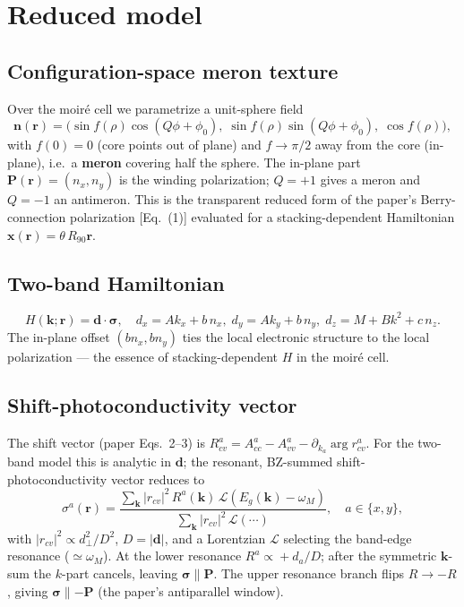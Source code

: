\documentclass[11pt]{article}
\begin{document}
\section{Reduced model}
\subsection{Configuration-space meron texture}
Over the moir\'e cell we parametrize a unit-sphere field
\begin{equation}
\mathbf n(\mathbf r)=\big(\sin f(\rho)\cos(Q\phi+\phi_0),\;\sin f(\rho)\sin(Q\phi+\phi_0),\;\cos f(\rho)\big),
\end{equation}
with $f(0)=0$ (core points out of plane) and $f\!\to\!\pi/2$ away from the core (in-plane),
i.e.\ a \textbf{meron} covering half the sphere. The in-plane part $\mathbf P(\mathbf r)=(n_x,n_y)$
is the winding polarization; $Q=+1$ gives a meron and $Q=-1$ an antimeron. This is the
transparent reduced form of the paper's Berry-connection polarization
[Eq.~(1)] evaluated for a stacking-dependent Hamiltonian $\mathbf x(\mathbf r)=\theta\,R_{90}\mathbf r$.

\subsection{Two-band Hamiltonian}
\begin{equation}
H(\mathbf k;\mathbf r)=\mathbf d\cdot\boldsymbol\sigma,\quad
d_x=Ak_x+b\,n_x,\; d_y=Ak_y+b\,n_y,\; d_z=M+B k^2+c\,n_z .
\end{equation}
The in-plane offset $(b n_x, b n_y)$ ties the local electronic structure to the local
polarization --- the essence of stacking-dependent $H$ in the moir\'e cell.

\subsection{Shift-photoconductivity vector}
The shift vector (paper Eqs.~2--3) is
$R^a_{cv}=A^a_{cc}-A^a_{vv}-\partial_{k_a}\arg r^a_{cv}$.
For the two-band model this is analytic in $\mathbf d$; the resonant, BZ-summed
shift-photoconductivity vector reduces to
\begin{equation}
\sigma^a(\mathbf r)=\frac{\sum_{\mathbf k} |r_{cv}|^2\, R^a(\mathbf k)\, \mathcal L(E_g(\mathbf k)-\omega_M)}
{\sum_{\mathbf k}|r_{cv}|^2\,\mathcal L(\cdots)},\quad a\in\{x,y\},
\end{equation}
with $|r_{cv}|^2\propto d_\perp^2/D^2$, $D=|\mathbf d|$, and a Lorentzian $\mathcal L$ selecting the
band-edge resonance ($\simeq\omega_M$). At the lower resonance $R^a\!\propto\!+d_a/D$; after the
symmetric $\mathbf k$-sum the $k$-part cancels, leaving $\boldsymbol\sigma\parallel\mathbf P$. The upper
resonance branch flips $R\to-R$, giving $\boldsymbol\sigma\parallel-\mathbf P$ (the paper's antiparallel window).
\end{document}
